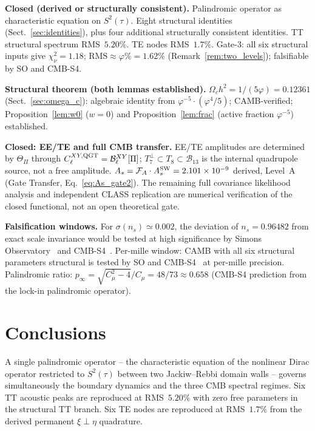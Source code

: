 \documentclass[twocolumn,10pt]{article}
\newcommand{\vp}{\varphi}
\begin{document}
\textbf{Closed (derived or structurally consistent).}
Palindromic operator as characteristic equation on $S^2(\tau)$.
Eight structural identities (Sect.~\ref{sec:identities}),
plus four additional structurally consistent identities.
TT structural spectrum RMS~$5.20\%$.
TE nodes RMS~$1.7\%$.
Gate-3: all six structural inputs give
$\chi^2_\nu=1.18$; $\mathrm{RMS}\approx\vp\%=1.62\%$
(Remark~\ref{rem:two_levels}); falsifiable by SO and CMB-S4.

\textbf{Structural theorem (both lemmas established).}
$\Omega_ch^2=1/(5\vp)=0.12361$ (Sect.~\ref{sec:omega_c}): algebraic
identity from $\vp^{-5}\cdot(\vp^4/5)$; CAMB-verified;
Proposition~\ref{lem:w0} ($w=0$) and Proposition~\ref{lem:frac}
(active fraction $\vp^{-5}$) established.

\textbf{Closed: EE/TE and full CMB transfer.}
EE/TE amplitudes are determined by $\Theta_\Pi$ through
$C_\ell^{XY,{\rm QGT}}=\mathcal{B}_\ell^{XY}[\Pi]$;
$T_7^\perp\subset T_8\subset\mathcal{B}_{13}$ is the internal
quadrupole source, not a free amplitude.
$A_s=\mathcal{F}_A\cdot A_s^{\rm SW}=2.101\times10^{-9}$
derived, Level~A (Gate Transfer, Eq.~\ref{eq:As_gate2}).
The remaining full covariance likelihood analysis and independent
CLASS replication are numerical verification of the closed functional,
not an open theoretical gate.

\textbf{Falsification windows.}
For $\sigma(n_s)\simeq0.002$, the deviation of
$n_s=0.96482$ from exact scale invariance would be tested
at high significance by Simons Observatory~\cite{SO2019} and CMB-S4~\cite{CMBS4}.
Per-mille window: CAMB with all six structural parameters
structural is tested by SO and CMB-S4~\cite{CMBS4} at per-mille precision.
Palindromic ratio: $p_\infty=\sqrt{C_\mu^2-4}/C_\mu=48/73\approx0.658$
(CMB-S4 prediction from the lock-in palindromic operator).

\section{Conclusions}
\label{sec:conclusions}

A single palindromic operator -- the characteristic equation of the
nonlinear Dirac operator restricted to $S^2(\tau)$ between two
Jackiw--Rebbi domain walls -- governs simultaneously the boundary
dynamics and the three CMB spectral regimes. Six TT acoustic peaks
are reproduced at RMS~$5.20\%$ with zero free parameters in the structural TT branch.
Six TE nodes are reproduced at RMS~$1.7\%$ from the derived
permanent $\xi\perp\eta$ quadrature.
\end{document}

